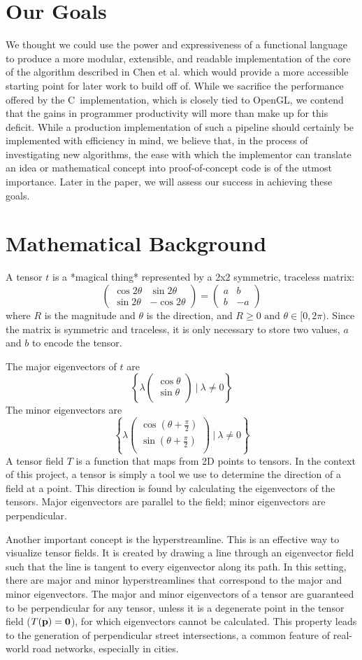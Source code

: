 \documentclass[twocolumn]{article}
\newcommand{\sqmat}[4]{\ensuremath{
    \left(\begin{array}{cc}
        #1 & #2 \\
        #3 & #4
    \end{array}\right)}}
\newcommand{\mkvec}[2]{\ensuremath{
    \left(\begin{array}{c}
        #1 \\
        #2 \\
    \end{array}\right)}}
\def \cpp {C\nolinebreak[4]\hspace{-.05em}\raisebox{.4ex}{\tiny\bf ++}~}
\begin{document}
\section{Our Goals}
We thought we could use the power and expressiveness of a functional language 
to produce a more modular, extensible, and readable implementation of the core 
of the algorithm described in Chen et al. which would provide a more 
accessible starting point for later work to build off of. While we sacrifice 
the performance offered by the \cpp implementation, which is closely tied to
OpenGL, we contend that the gains in programmer productivity will more than
make up for this deficit. While a production implementation of such a pipeline
should certainly be implemented with efficiency in mind, we believe that, in
the process of investigating new algorithms, the ease with which the
implementor can translate an idea or mathematical concept into proof-of-concept
code is of the utmost importance. Later in the paper, we will assess our
success in achieving these goals.

\section{Mathematical Background}
A tensor $t$ is a *magical thing* represented by a 2x2 symmetric, traceless
matrix:
\[
    \sqmat{\cos{2\theta}}{\sin{2\theta}}{\sin{2\theta}}{-\cos{2\theta}}
    = \sqmat{a}{b}{b}{-a}
\]
where $R$ is the magnitude and $\theta$ is the direction, and
$R\geq0 \textrm{ and } \theta\in[0,2\pi)$. Since the matrix is symmetric and
traceless, it is only necessary to store two values, $a$ and $b$ to encode
the tensor.

The major eigenvectors of $t$ are
\[
    \left\{
        \lambda\mkvec{\cos{\theta}}{\sin{\theta}} ~|~ \lambda \neq 0
    \right\}
\]
The minor eigenvectors are
\[
    \left\{
        \lambda\mkvec
                {\cos{(\theta+\frac{\pi}{2})}}
                {\sin{(\theta+\frac{\pi}{2})}}
        ~|~ \lambda \neq 0
    \right\}
\]
A tensor field $T$ is a function that maps from 2D points to tensors. In the
context of this project, a tensor is simply a tool we use to determine the
direction of a field at a point. This direction is found by calculating the
eigenvectors of the tensors. Major eigenvectors are parallel to the field;
minor eigenvectors are perpendicular.

Another important concept is the hyperstreamline. This is an effective way to
visualize tensor fields. It is created by drawing a line through an eigenvector
field such that the line is tangent to every eigenvector along its path. In
this setting, there are major and minor hyperstreamlines that correspond to the
major and minor eigenvectors. The major and minor eigenvectors of a tensor are
guaranteed to be perpendicular for any tensor, unless it is a degenerate point
in the tensor field ($T(\bf p)=0$), for which eigenvectors cannot be
calculated. This property leads to the generation of perpendicular street
intersections, a common feature of real-world road networks, especially in
cities.
\end{document}
